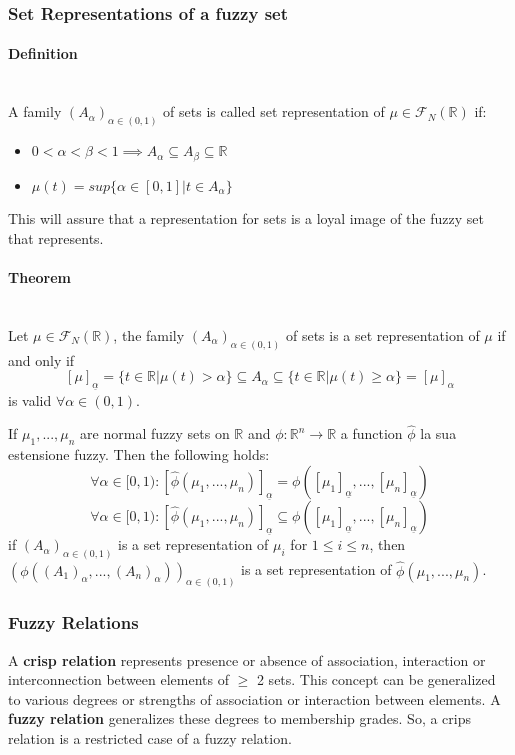 \documentclass{article}
\begin{document}
\subsubsection{Set Representations of a fuzzy set}
\paragraph{Definition}\mbox{}\\
A family $(A_\alpha)_{\alpha\in (0,1)}$ of sets is called set representation of $\mu\in\mathcal{F}_N(\mathbb{R})$ if:
\begin{itemize}
    \item $0<\alpha<\beta<1\implies A_\alpha\subseteq A_\beta\subseteq\mathbb{R}$
    \item $\mu(t)=sup\{\alpha\in [0,1]|t\in A_\alpha\}$
\end{itemize}
This will assure that a representation for sets is a loyal image of the fuzzy set that represents.
\paragraph{Theorem}\mbox{}\\
Let $\mu\in\mathcal{F}_N(\mathbb{R})$, the family $(A_\alpha)_{\alpha\in (0,1)}$ of sets is a set
representation of $\mu$ if and only if
$$[\mu]_{\underline{\alpha}} = \{t\in\mathbb{R}|\mu(t) > \alpha \}\subseteq A_\alpha \subseteq \{t\in\mathbb{R}|\mu (t) \geq \alpha\}=[\mu]_\alpha$$
is valid $\forall \alpha\in (0,1)$.

If $\mu_1,...,\mu_n$ are normal fuzzy sets on $\mathbb{R}$ and $\phi:\mathbb{R}^n\rightarrow\mathbb{R}$
a function $\hat{\phi}$ la sua estensione fuzzy. Then the following holds:
$$\forall\alpha\in [0,1) : [\hat{\phi}(\mu_1,...,\mu_n)]_{\underline{\alpha}}=\phi([\mu_1]_{\underline{\alpha}},...,[\mu_n]_{\underline{\alpha}})$$
$$\forall\alpha\in [0,1) : [\hat{\phi}(\mu_1,...,\mu_n)]_{\underline{\alpha}}\subseteq\phi([\mu_1]_{\underline{\alpha}},...,[\mu_n]_{\underline{\alpha}})$$
if $(A_\alpha)_{\alpha\in (0,1)}$ is a set representation of $\mu_i$ for $1\leq i\leq n$, then
$\left(\phi((A_1)_\alpha,...,(A_n)_\alpha)\right)_{\alpha\in (0,1)}$ is a set representation of
$\hat{\phi}(\mu_1,...,\mu_n)$.

\subsubsection{Fuzzy Relations}
A \textbf{crisp relation} represents presence or absence of association, interaction or interconnection
between elements of $\geq$ 2 sets. This concept can be generalized to various degrees or strengths
of association or interaction between elements.
\newline\newline
A \textbf{fuzzy relation} generalizes these degrees to membership grades. So, a crips relation is a
restricted case of a fuzzy relation.
\end{document}
